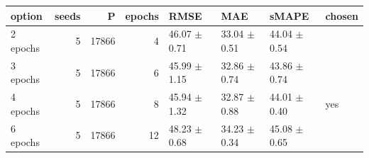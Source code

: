 \begin{tabular}{lrrrllll}
\toprule
option & seeds & P & epochs & RMSE & MAE & sMAPE & chosen \\
\midrule
2 epochs & 5 & 17866 & 4 & 46.07 $\pm$ 0.71 & 33.04 $\pm$ 0.51 & 44.04 $\pm$ 0.54 &  \\
3 epochs & 5 & 17866 & 6 & 45.99 $\pm$ 1.15 & 32.86 $\pm$ 0.74 & 43.86 $\pm$ 0.74 &  \\
4 epochs & 5 & 17866 & 8 & 45.94 $\pm$ 1.32 & 32.87 $\pm$ 0.88 & 44.01 $\pm$ 0.40 & yes \\
6 epochs & 5 & 17866 & 12 & 48.23 $\pm$ 0.68 & 34.23 $\pm$ 0.34 & 45.08 $\pm$ 0.65 &  \\
\bottomrule
\end{tabular}
